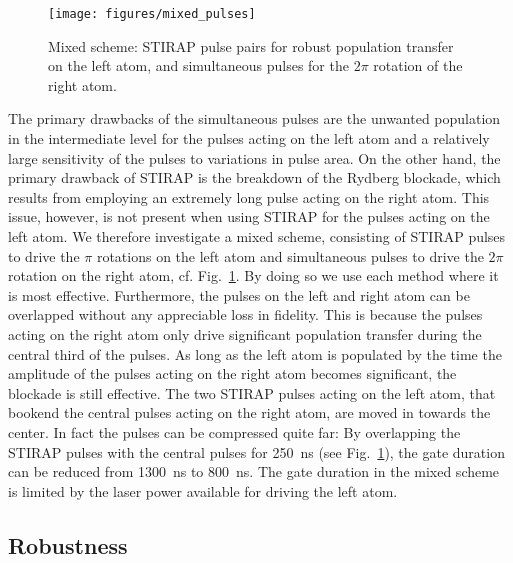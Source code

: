 \begin{figure}[tb]
  \begin{center}
    \texttt{[image: figures/mixed\_pulses]}
  \end{center}
  \caption{%
    Mixed scheme: STIRAP pulse pairs for robust population
    transfer on the left atom, and simultaneous pulses for the $2\pi$
    rotation of the right atom.
  }
  \label{fig:mixed}
\end{figure}
The primary drawbacks of the simultaneous pulses are the
unwanted population in the intermediate level for the pulses acting on
the left atom and a relatively large sensitivity of
the pulses to variations in pulse area.
On the other hand, the primary drawback
of STIRAP is the breakdown of the Rydberg blockade, which
results from employing an extremely long  pulse acting on the right
atom. This issue, however, is  not present when using STIRAP for the
pulses acting on the left atom. We therefore investigate a mixed
scheme, consisting of STIRAP pulses to drive the $\pi$ rotations on
the left atom and simultaneous pulses to drive the $2\pi$ rotation on
the right atom, cf. Fig.~\ref{fig:mixed}. By doing so we
use each method where it is most effective.
Furthermore, the pulses on the left and right atom can be overlapped
without any appreciable loss in fidelity. This is because the
pulses acting on the right atom only drive significant population
transfer during the central third of the pulses. As long as the left
atom is populated by the time the amplitude of the pulses acting on
the right atom becomes significant, the blockade is still effective. The two
STIRAP pulses acting on the left atom, that bookend the central pulses
acting on the right atom, are moved in towards the center.
In fact the pulses can be compressed
quite far: By overlapping the STIRAP pulses
with the central pulses for \SI{250}{ns} (see Fig.~\ref{fig:mixed}),
the gate duration can be
reduced from \SI{1300}{ns} to \SI{800}{ns}. The gate duration in the mixed scheme is
limited by the laser power available for driving the left atom.

\subsection{Robustness}
\label{subsec:RydRobust}

